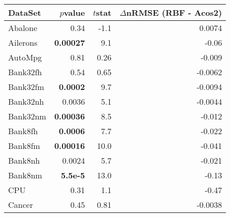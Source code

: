%
\begin{tabular}{lrrr}
	\toprule
	\textbf{DataSet}    & \textbf{$p$\textendash{}value} & \textbf{$t$\textendash{}stat} & \textbf{$\Delta$nRMSE (RBF - Acos2)} \\\midrule
	Abalone             & 0.34                           & -1.1                          & 0.0074                               \\
	Ailerons            & \textbf{0.00027}               & 9.1                           & -0.06                                \\
	AutoMpg             & 0.81                           & 0.26                          & -0.009                               \\
	Bank32fh            & 0.54                           & 0.65                          & -0.0062                              \\
	Bank32fm            & \textbf{0.0002}                & 9.7                           & -0.0094                              \\
	\addlinespace
	Bank32nh            & 0.0036                         & 5.1                           & -0.0044                              \\
	Bank32nm            & \textbf{0.00036}               & 8.5                           & -0.012                               \\
	Bank8fh             & \textbf{0.0006}                & 7.7                           & -0.022                               \\
	Bank8fm             & \textbf{0.00016}               & 10.0                          & -0.041                               \\
	Bank8nh             & 0.0024                         & 5.7                           & -0.021                               \\
	\addlinespace
	Bank8nm             & \textbf{5.5e-5}                & 13.0                          & -0.13                                \\
	CPU                 & 0.31                           & 1.1                           & -0.47                                \\
	Cancer              & 0.45                           & 0.81                          & -0.0038                              \\

\end{tabular}
